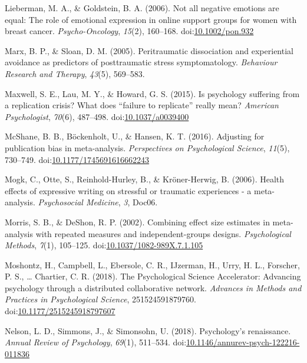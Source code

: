 \documentclass[man]{apa6}
\theoremstyle{definition}
\theoremstyle{definition}
\theoremstyle{definition}
\theoremstyle{remark}
\begin{document}
\hypertarget{ref-Lieberman2006}{}
Lieberman, M. A., \& Goldstein, B. A. (2006). Not all negative emotions
are equal: The role of emotional expression in online support groups for
women with breast cancer. \emph{Psycho-Oncology}, \emph{15}(2),
160--168. doi:\href{https://doi.org/10.1002/pon.932}{10.1002/pon.932}

\hypertarget{ref-Marx2005}{}
Marx, B. P., \& Sloan, D. M. (2005). Peritraumatic dissociation and
experiential avoidance as predictors of posttraumatic stress
symptomatology. \emph{Behaviour Research and Therapy}, \emph{43}(5),
569--583.

\hypertarget{ref-Maxwell2015}{}
Maxwell, S. E., Lau, M. Y., \& Howard, G. S. (2015). Is psychology
suffering from a replication crisis? What does ``failure to replicate''
really mean? \emph{American Psychologist}, \emph{70}(6), 487--498.
doi:\href{https://doi.org/10.1037/a0039400}{10.1037/a0039400}

\hypertarget{ref-McShane2016}{}
McShane, B. B., Böckenholt, U., \& Hansen, K. T. (2016). Adjusting for
publication bias in meta-analysis. \emph{Perspectives on Psychological
Science}, \emph{11}(5), 730--749.
doi:\href{https://doi.org/10.1177/1745691616662243}{10.1177/1745691616662243}

\hypertarget{ref-Mogk2006}{}
Mogk, C., Otte, S., Reinhold-Hurley, B., \& Kröner-Herwig, B. (2006).
Health effects of expressive writing on stressful or traumatic
experiences - a meta-analysis. \emph{Psychosocial Medicine}, \emph{3},
Doc06.

\hypertarget{ref-Morris2002}{}
Morris, S. B., \& DeShon, R. P. (2002). Combining effect size estimates
in meta-analysis with repeated measures and independent-groups designs.
\emph{Psychological Methods}, \emph{7}(1), 105--125.
doi:\href{https://doi.org/10.1037/1082-989X.7.1.105}{10.1037/1082-989X.7.1.105}

\hypertarget{ref-Moshontz2018}{}
Moshontz, H., Campbell, L., Ebersole, C. R., IJzerman, H., Urry, H. L.,
Forscher, P. S., \ldots{} Chartier, C. R. (2018). The Psychological
Science Accelerator: Advancing psychology through a distributed
collaborative network. \emph{Advances in Methods and Practices in
Psychological Science}, 251524591879760.
doi:\href{https://doi.org/10.1177/2515245918797607}{10.1177/2515245918797607}

\hypertarget{ref-Nelson2018}{}
Nelson, L. D., Simmons, J., \& Simonsohn, U. (2018). Psychology's
renaissance. \emph{Annual Review of Psychology}, \emph{69}(1), 511--534.
doi:\href{https://doi.org/10.1146/annurev-psych-122216-011836}{10.1146/annurev-psych-122216-011836}
\end{document}

